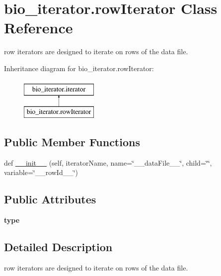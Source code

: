 \hypertarget{classbio__iterator_1_1row_iterator}{}\section{bio\+\_\+iterator.\+row\+Iterator Class Reference}
\label{classbio__iterator_1_1row_iterator}


row iterators are designed to iterate on rows of the data file.  


Inheritance diagram for bio\+\_\+iterator.\+row\+Iterator\+:\begin{figure}[H]
\begin{center}
\leavevmode
\includegraphics[height=2.000000cm]{classbio__iterator_1_1row_iterator}
\end{center}
\end{figure}
\subsection*{Public Member Functions}
\begin{DoxyCompactItemize}
\item 
def \hyperlink{classbio__iterator_1_1row_iterator_a344d14b5e9f6552687ea4e137ee36e8c}{\+\_\+\+\_\+init\+\_\+\+\_\+} (self, iterator\+Name, name=\char`\"{}\+\_\+\+\_\+data\+File\+\_\+\+\_\+\char`\"{}, child=\char`\"{}\char`\"{}, variable=\char`\"{}\+\_\+\+\_\+row\+Id\+\_\+\+\_\+\char`\"{})
\end{DoxyCompactItemize}
\subsection*{Public Attributes}
\begin{DoxyCompactItemize}
\item 
{\bfseries type}\hypertarget{classbio__iterator_1_1row_iterator_a176ad0bad3c81c72fe75cd63929ec926}{}\label{classbio__iterator_1_1row_iterator_a176ad0bad3c81c72fe75cd63929ec926}

\end{DoxyCompactItemize}


\subsection{Detailed Description}
row iterators are designed to iterate on rows of the data file. 


